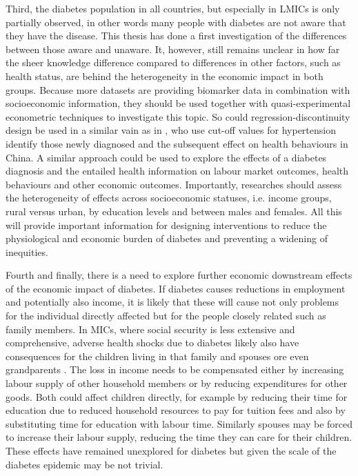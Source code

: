 Third, the diabetes population in all countries, but especially in \acp{LMIC} is only partially observed, in other words many people with diabetes are not aware that they have the disease. This thesis has done a first investigation of the differences between those aware and unaware. It, however, still remains unclear in how far the sheer knowledge difference compared to differences in other factors, such as health status, are behind the heterogeneity in the economic impact in both groups. Because more datasets are providing biomarker data in combination with socioeconomic information, they should be used together with quasi-experimental econometric techniques to investigate this topic. So could regression-discontinuity design be used in a similar vain as in \textcite{Zhao2013a}, who use cut-off values for hypertension identify those newly diagnosed and the subsequent effect on health behaviours in China. A similar approach could be used to explore the effects of a diabetes diagnosis and the entailed health information on labour market outcomes, health behaviours and other economic outcomes. Importantly, researches should assess the heterogeneity of effects across socioeconomic statuses, i.e. income groups, rural versus urban, by education levels and between males and females. All this will provide important information for designing interventions to reduce the physiological and economic burden of diabetes and preventing a widening of inequities.

Fourth and finally, there is a need to explore further economic downstream effects of the economic impact of diabetes. If diabetes causes reductions in employment and potentially also income, it is likely that these will cause not only problems for the individual directly affected but for the people closely related such as family members. In \acp{MIC}, where social security is less extensive and comprehensive, adverse health shocks due to diabetes likely also have consequences for the children living in that family and spouses ore even grandparents \parencite{Alam2014}. The loss in income needs to be compensated either by increasing labour supply of other household members or by reducing expenditures for other goods. Both could affect children directly, for example by reducing their time for education due to reduced household resources to pay for tuition fees and also by substituting time for education with labour time. Similarly spouses may be forced to increase their labour supply, reducing the time they can care for their children. These effects have remained unexplored for diabetes but given the scale of the diabetes epidemic may be not trivial.

